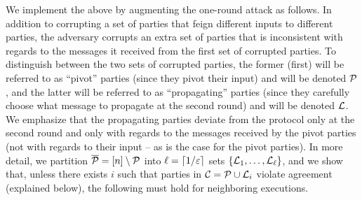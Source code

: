 We implement the above by augmenting the one-round attack as follows. In addition to corrupting a set of parties that feign different inputs to different parties, the adversary corrupts an extra set of parties that is inconsistent with regards to the messages it received from the first set of corrupted parties.  To distinguish between the two sets of corrupted parties, the former (first) will be referred to as ``pivot'' parties (since they pivot their input) and will be denoted $\mathcal{P}$, and the latter will be referred to as ``propagating'' parties (since they carefully choose what message to propagate at the second round) and will be denoted ${\cal{L}}$. We emphasize that the propagating parties deviate from the protocol only at the second round and only with regards to the messages received by the pivot parties (not with regards to their input -- as is the case for the pivot parties). In more detail, we partition ${\overline{\mathcal{P}}} = [n]\setminus \mathcal{P}$ into $\ell=\lceil 1/\varepsilon\rceil$ sets $\{{\cal{L}}_1,\ldots,{\cal{L}}_\ell\}$, and we show that, unless there exists $i$ such that parties in $\mathcal{C}= \mathcal{P}\cup {\cal{L}}_i$ violate agreement (explained below), the following must hold for neighboring executions.

